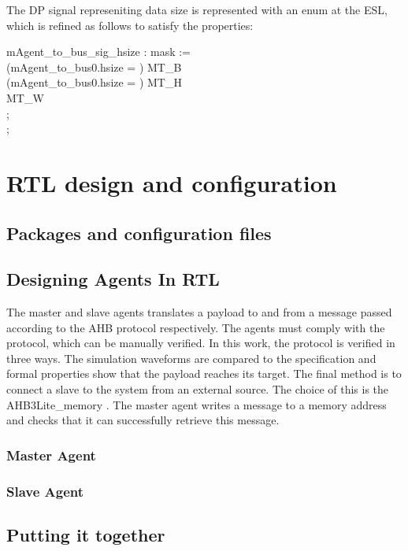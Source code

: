 The DP signal represeniting data size is represented with an enum at the ESL, which is refined as follows to satisfy the properties: \par
{} mAgent\_to\_bus\_sig\_hsize : mask := \\
(mAgent\_to\_bus0.hsize = )  MT\_B \\
(mAgent\_to\_bus0.hsize = )  MT\_H\\
 MT\_W \\
; \\ 
; \par


\section{RTL design and configuration}

\subsection{Packages and configuration files}


\subsection{Designing Agents In RTL}
The master and slave agents translates a payload to and from a message passed according to the AHB protocol respectively. The agents must comply with the protocol, which can be manually verified. In this work, the protocol is verified in three ways. The simulation waveforms are compared to the specification and formal properties show that the payload reaches its target. The final method is to connect a slave to the system from an external source. The choice of this is the AHB3Lite\_memory \cite{ahbmen}. The master agent writes a message to a memory address and checks that it can successfully retrieve this message. 

\subsubsection{Master Agent}



\subsubsection{Slave Agent}


\subsection{Putting it together}



